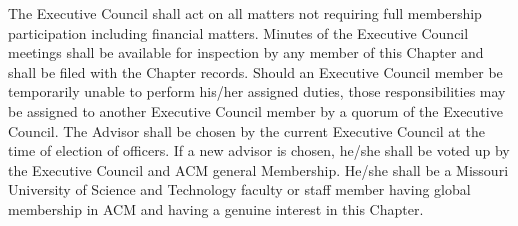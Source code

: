 \documentclass[11pt,a4paper,notitlepage]{article}
\begin{document}
The Executive Council shall act on all matters not requiring full membership
participation including financial matters. Minutes of the Executive Council
meetings shall be available for inspection by any member of this Chapter and
shall be filed with the Chapter records. Should an Executive Council member be
temporarily unable to perform his/her assigned duties, those responsibilities
may be assigned to another Executive Council member by a quorum of the Executive
Council. The Advisor shall be chosen by the current Executive Council at the
time of election of officers. If a new advisor is chosen, he/she shall be voted
up by the Executive Council and ACM general Membership. He/she shall be a
Missouri University of Science and Technology faculty or staff member having
global membership in ACM and having a genuine interest in this Chapter.
\fi
\end{document}
